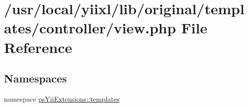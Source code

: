 \hypertarget{controller_2view_8php}{
\section{/usr/local/yiixl/lib/original/templates/controller/view.php File Reference}
\label{controller_2view_8php}
}
\subsection*{Namespaces}
\begin{DoxyCompactItemize}
\item 
namespace \hyperlink{namespacepsYiiExtensions_1_1templates}{psYiiExtensions::templates}
\end{DoxyCompactItemize}
